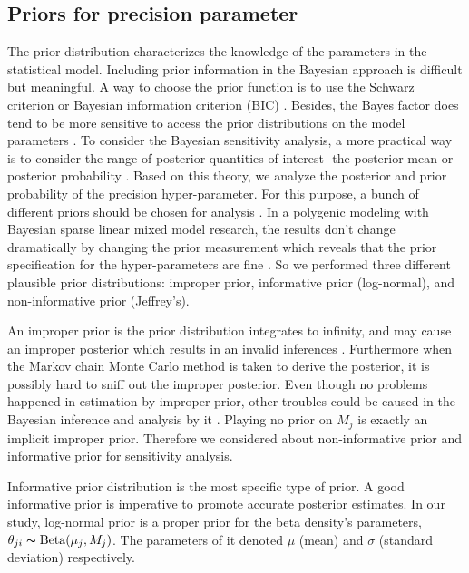 \documentclass[11pt,reqno]{amsart}
\begin{document}
\subsection{Priors for precision parameter}
The prior distribution characterizes the knowledge of the parameters in the statistical model. Including prior information in the Bayesian approach is difficult but meaningful. A way to choose the prior function is to use the Schwarz criterion or Bayesian information criterion (BIC) \citep{weakliem1999critique}. Besides, the Bayes factor does tend to be more sensitive to access the prior distributions on the model parameters \citep{kass1995bayes}. To consider the Bayesian sensitivity analysis, a more practical way is to consider the range of posterior quantities of interest- the posterior mean or posterior probability \citep{bayarri1998robust, harrison2013bayesian}. Based on this theory, we analyze the posterior and prior probability of the precision hyper-parameter.
For this purpose, a bunch of different priors should be chosen for analysis \citep{gelman2006prior}. In a polygenic modeling with Bayesian sparse linear mixed model research, the results don't change dramatically by changing the prior measurement which reveals that the prior specification for the hyper-parameters are fine \citep{zhou2013polygenic}. So we performed three different plausible prior distributions: improper prior, informative prior (log-normal), and non-informative prior (Jeffrey's).

An improper prior is the prior distribution integrates to infinity, and may cause an improper posterior which results in an invalid inferences \citep{lesaffre2012bayesian}.
Furthermore when the Markov chain Monte Carlo method is taken to derive the posterior, it is possibly hard to sniff out the improper posterior.
Even though no problems happened in estimation by improper prior, other troubles could be caused in the Bayesian inference and analysis by it \citep{stein1965approximation}.
Playing no prior on $ M_{j}$ is exactly an implicit improper prior. Therefore we considered about non-informative prior and informative prior for sensitivity analysis.

Informative prior distribution is the most specific type of prior. A good informative prior is imperative to promote accurate posterior estimates.
In our study, log-normal prior is a proper prior for the beta density's parameters, $\theta_{ji} \thicksim \text{Beta}(\mu_j, M_j)$.
The parameters of it denoted $\mu$ (mean) and $\sigma$ (standard deviation) respectively.
\end{document}
